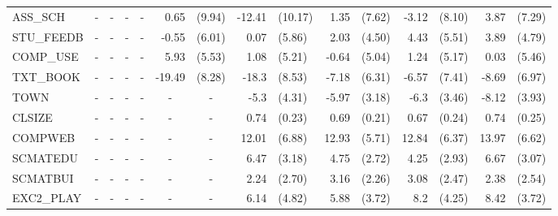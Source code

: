 \documentclass[12pt]{article}%
\begin{document}
\begin{table}[H]
\begin{tabular}{lrlrlrlrlrlrlrl}
			ASS\_SCH & \multicolumn{1}{c}{-} & \multicolumn{1}{c}{-} & \multicolumn{1}{c}{-} & \multicolumn{1}{c}{-} & 0.65  & (9.94) & -12.41 & (10.17) & 1.35  & (7.62) & -3.12 & (8.10) & 3.87  & (7.29) \\[0.2em]
			STU\_FEEDB & \multicolumn{1}{c}{-} & \multicolumn{1}{c}{-} & \multicolumn{1}{c}{-} & \multicolumn{1}{c}{-} & -0.55 & (6.01) & 0.07  & (5.86) & 2.03  & (4.50) & 4.43  & (5.51) & 3.89  & (4.79) \\[0.2em]
			COMP\_USE & \multicolumn{1}{c}{-} & \multicolumn{1}{c}{-} & \multicolumn{1}{c}{-} & \multicolumn{1}{c}{-} & 5.93  & (5.53) & 1.08  & (5.21) & -0.64 & (5.04) & 1.24  & (5.17) & 0.03  & (5.46) \\[0.2em]
			TXT\_BOOK & \multicolumn{1}{c}{-} & \multicolumn{1}{c}{-} & \multicolumn{1}{c}{-} & \multicolumn{1}{c}{-} & -19.49 & (8.28) & -18.3 & (8.53) & -7.18 & (6.31) & -6.57 & (7.41) & -8.69 & (6.97) \\[0.2em]
			TOWN  & \multicolumn{1}{c}{-} & \multicolumn{1}{c}{-} & \multicolumn{1}{c}{-} & \multicolumn{1}{c}{-} & \multicolumn{1}{c}{-} & \multicolumn{1}{c}{-} & -5.3  & (4.31) & -5.97 & (3.18) & -6.3  & (3.46) & -8.12 & (3.93) \\[0.2em]
			CLSIZE & \multicolumn{1}{c}{-} & \multicolumn{1}{c}{-} & \multicolumn{1}{c}{-} & \multicolumn{1}{c}{-} & \multicolumn{1}{c}{-} & \multicolumn{1}{c}{-} & 0.74  & (0.23) & 0.69  & (0.21) & 0.67  & (0.24) & 0.74  & (0.25) \\[0.2em]
			COMPWEB & \multicolumn{1}{c}{-} & \multicolumn{1}{c}{-} & \multicolumn{1}{c}{-} & \multicolumn{1}{c}{-} & \multicolumn{1}{c}{-} & \multicolumn{1}{c}{-} & 12.01 & (6.88) & 12.93 & (5.71) & 12.84 & (6.37) & 13.97 & (6.62) \\[0.2em]
			SCMATEDU & \multicolumn{1}{c}{-} & \multicolumn{1}{c}{-} & \multicolumn{1}{c}{-} & \multicolumn{1}{c}{-} & \multicolumn{1}{c}{-} & \multicolumn{1}{c}{-} & 6.47  & (3.18) & 4.75  & (2.72) & 4.25  & (2.93) & 6.67  & (3.07) \\[0.2em]
			SCMATBUI & \multicolumn{1}{c}{-} & \multicolumn{1}{c}{-} & \multicolumn{1}{c}{-} & \multicolumn{1}{c}{-} & \multicolumn{1}{c}{-} & \multicolumn{1}{c}{-} & 2.24  & (2.70) & 3.16  & (2.26) & 3.08  & (2.47) & 2.38  & (2.54) \\[0.2em]
			EXC2\_PLAY & \multicolumn{1}{c}{-} & \multicolumn{1}{c}{-} & \multicolumn{1}{c}{-} & \multicolumn{1}{c}{-} & \multicolumn{1}{c}{-} & \multicolumn{1}{c}{-} & 6.14  & (4.82) & 5.88  & (3.72) & 8.2   & (4.25) & 8.42  & (3.72) \\[0.2em]

\end{tabular}
\end{table}
\end{document}
